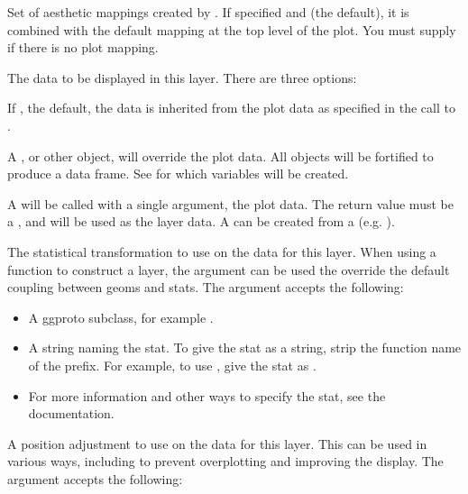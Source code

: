 \documentclass[letterpaper]{book}
\begin{document}
\begin{Arguments}
\begin{ldescription}
\item[\code{mapping}] Set of aesthetic mappings created by . If specified and
 (the default), it is combined with the default mapping
at the top level of the plot. You must supply  if there is no plot
mapping.

\item[\code{data}] The data to be displayed in this layer. There are three
options:

If , the default, the data is inherited from the plot
data as specified in the call to .

A , or other object, will override the plot
data. All objects will be fortified to produce a data frame. See
 for which variables will be created.

A  will be called with a single argument,
the plot data. The return value must be a , and
will be used as the layer data. A  can be created
from a  (e.g. ).

\item[\code{stat}] The statistical transformation to use on the data for this layer.
When using a  function to construct a layer, the 
argument can be used the override the default coupling between geoms and
stats. The  argument accepts the following:
\begin{itemize}

\item{} A  ggproto subclass, for example .
\item{} A string naming the stat. To give the stat as a string, strip the
function name of the  prefix. For example, to use ,
give the stat as .
\item{} For more information and other ways to specify the stat, see the
 documentation.

\end{itemize}


\item[\code{position}] A position adjustment to use on the data for this layer. This
can be used in various ways, including to prevent overplotting and
improving the display. The  argument accepts the following:
\begin{itemize}


\end{itemize}
\end{ldescription}
\end{Arguments}
\end{document}
